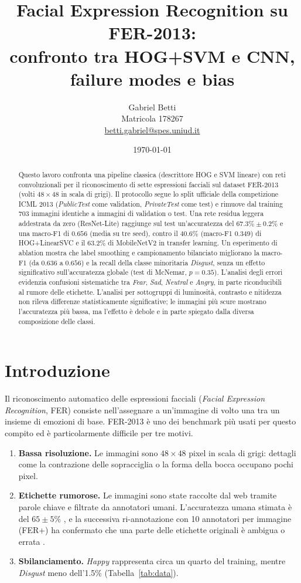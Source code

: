 \documentclass[11pt,a4paper]{article}
\title{\textbf{Facial Expression Recognition su FER-2013:\\confronto tra HOG+SVM e CNN, failure modes e bias}}
\author{Gabriel Betti \\ Matricola 178267 \\ \href{mailto:betti.gabriel@spes.uniud.it}{betti.gabriel@spes.uniud.it}}
\date{\today}
\begin{document}
\maketitle

\begin{abstract}
Questo lavoro confronta una pipeline classica (descrittore HOG e SVM lineare) con reti convoluzionali per il riconoscimento di sette espressioni facciali sul dataset FER-2013 (volti $48\times48$ in scala di grigi). Il protocollo segue lo split ufficiale della competizione ICML 2013 (\textit{PublicTest} come validation, \textit{PrivateTest} come test) e rimuove dal training 703 immagini identiche a immagini di validation o test. Una rete residua leggera addestrata da zero (ResNet-Lite) raggiunge sul test un'accuratezza del $67.3\% \pm 0.2\%$ e una macro-F1 di $0.656$ (media su tre seed), contro il $40.6\%$ (macro-F1 $0.349$) di HOG+LinearSVC e il $63.2\%$ di MobileNetV2 in transfer learning. Un esperimento di ablation mostra che label smoothing e campionamento bilanciato migliorano la macro-F1 (da $0.636$ a $0.656$) e la recall della classe minoritaria \textit{Disgust}, senza un effetto significativo sull'accuratezza globale (test di McNemar, $p=0.35$). L'analisi degli errori evidenzia confusioni sistematiche tra \textit{Fear}, \textit{Sad}, \textit{Neutral} e \textit{Angry}, in parte riconducibili al rumore delle etichette. L'analisi per sottogruppi di luminosità, contrasto e nitidezza non rileva differenze statisticamente significative; le immagini più scure mostrano l'accuratezza più bassa, ma l'effetto è debole e in parte spiegato dalla diversa composizione delle classi.
\end{abstract}

\section{Introduzione}
Il riconoscimento automatico delle espressioni facciali (\textit{Facial Expression Recognition}, FER) consiste nell'assegnare a un'immagine di volto una tra un insieme di emozioni di base. FER-2013 \cite{goodfellow2015challenges} è uno dei benchmark più usati per questo compito ed è particolarmente difficile per tre motivi.

\begin{enumerate}
    \item \textbf{Bassa risoluzione.} Le immagini sono $48\times48$ pixel in scala di grigi: dettagli come la contrazione delle sopracciglia o la forma della bocca occupano pochi pixel.
    \item \textbf{Etichette rumorose.} Le immagini sono state raccolte dal web tramite parole chiave e filtrate da annotatori umani. L'accuratezza umana stimata è del $65\pm5\%$ \cite{goodfellow2015challenges}, e la successiva ri-annotazione con 10 annotatori per immagine (FER+) ha confermato che una parte delle etichette originali è ambigua o errata \cite{barsoum2016ferplus}.
    \item \textbf{Sbilanciamento.} \textit{Happy} rappresenta circa un quarto del training, mentre \textit{Disgust} meno dell'1.5\% (Tabella~\ref{tab:data}).
\end{enumerate}
\end{document}

